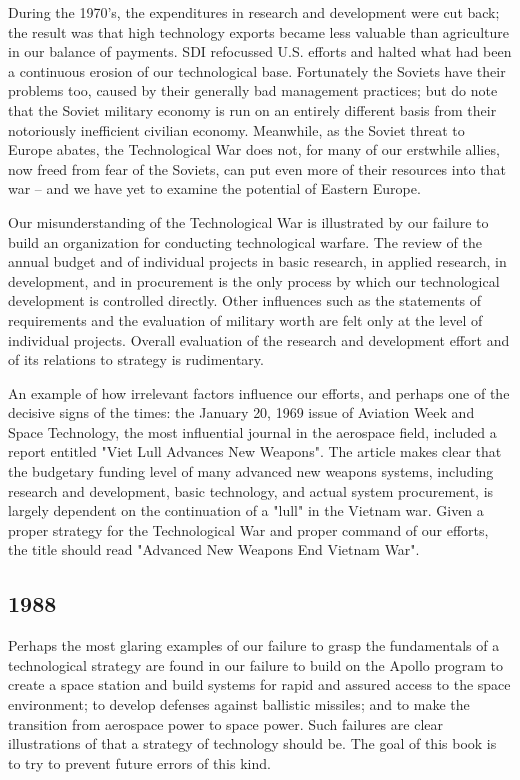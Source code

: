 \begin{mdframed}[backgroundcolor=black!10]
During the 1970's, the expenditures in research and development were cut back; the result was that high technology exports became less valuable than agriculture in our balance of payments. SDI refocussed U.S. efforts and halted what had been a continuous erosion of our technological base. Fortunately the Soviets have their problems too, caused by their generally bad management practices; but do note that the Soviet military economy is run on an entirely different basis from their notoriously inefficient civilian economy. Meanwhile, as the Soviet threat to Europe abates, the Technological War does not, for many of our erstwhile allies, now freed from fear of the Soviets, can put even more of their resources into that war -- and we have yet to examine the potential of Eastern Europe.
\end{mdframed}

Our misunderstanding of the Technological War is illustrated by our failure to build an organization for conducting technological warfare. The review of the annual budget and of individual projects in basic research, in applied research, in development, and in procurement is the only process by which our technological development is controlled directly. Other influences such as the statements of requirements and the evaluation of military worth are felt only at the level of individual projects. Overall evaluation of the research and development effort and of its relations to strategy is rudimentary.

An example of how irrelevant factors influence our efforts, and perhaps one of the decisive signs of the times: the January 20, 1969 issue of Aviation Week and Space Technology, the most influential journal in the aerospace field, included a report entitled "Viet Lull Advances New Weapons". The article makes clear that the budgetary funding level of many advanced new weapons systems, including research and development, basic technology, and actual system procurement, is largely dependent on the continuation of a "lull" in the Vietnam war. Given a proper strategy for the Technological War and proper command of our efforts, the title should read "Advanced New Weapons End Vietnam War".

\subsection{1988}
Perhaps the most glaring examples of our failure to grasp the fundamentals of a technological strategy are found in our failure to build on the Apollo program to create a space station and build systems for rapid and assured access to the space environment; to develop defenses against ballistic missiles; and to make the transition from aerospace power to space power. Such failures are clear illustrations of that a strategy of technology should be. The goal of this book is to try to prevent future errors of this kind.


